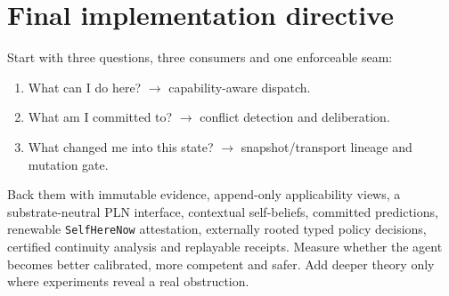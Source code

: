 \documentclass[11pt,oneside]{report}
\newcommand{\SelfHereNow}{\texttt{SelfHereNow}}
\begin{document}
\chapter*{Final implementation directive}

\begin{decisionbox}
Start with three questions, three consumers and one enforceable seam:

\begin{enumerate}
  \item What can I do here? $\rightarrow$ capability-aware dispatch.
  \item What am I committed to? $\rightarrow$ conflict detection and deliberation.
  \item What changed me into this state? $\rightarrow$ snapshot/transport lineage and mutation gate.
\end{enumerate}

Back them with immutable evidence, append-only applicability views, a substrate-neutral PLN interface, contextual self-beliefs, committed predictions, renewable \SelfHereNow{} attestation, externally rooted typed policy decisions, certified continuity analysis and replayable receipts. Measure whether the agent becomes better calibrated, more competent and safer. Add deeper theory only where experiments reveal a real obstruction.
\end{decisionbox}
\end{document}

